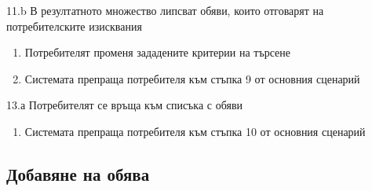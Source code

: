 \documentclass[a4paper]{article}
\begin{document}
\begin{usecase}
{        \item[11.b] В резултатното множество липсват обяви, които отговарят на потребителските изисквания
                \begin{enumerate}[1.]
                \item Потребителят променя зададените критерии на търсене
                \item Системата препраща потребителя към стъпка 9 от основния сценарий
                \end{enumerate}

        \item[13.а] Потребителят се връща към списъка с обяви
                \begin{enumerate}[1.]
                \item Системата препраща потребителя към стъпка 10 от основния сценарий
                \end{enumerate}

}                
\end{usecase}

\subsection{Добавяне на обява} %
\end{document}
